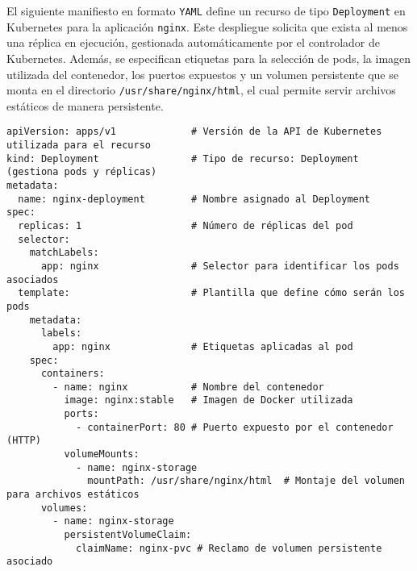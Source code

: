 El siguiente manifiesto en formato \texttt{YAML} define un recurso de tipo \texttt{Deployment} en Kubernetes para la aplicación \texttt{nginx}. Este despliegue solicita que exista al menos una réplica en ejecución, gestionada automáticamente por el controlador de Kubernetes. Además, se especifican etiquetas para la selección de pods, la imagen utilizada del contenedor, los puertos expuestos y un volumen persistente que se monta en el directorio \texttt{/usr/share/nginx/html}, el cual permite servir archivos estáticos de manera persistente.

\begin{verbatim}
apiVersion: apps/v1             # Versión de la API de Kubernetes utilizada para el recurso
kind: Deployment                # Tipo de recurso: Deployment (gestiona pods y réplicas)
metadata:
  name: nginx-deployment        # Nombre asignado al Deployment
spec:
  replicas: 1                   # Número de réplicas del pod
  selector:
    matchLabels:
      app: nginx                # Selector para identificar los pods asociados
  template:                     # Plantilla que define cómo serán los pods
    metadata:
      labels:
        app: nginx              # Etiquetas aplicadas al pod
    spec:
      containers:
        - name: nginx           # Nombre del contenedor
          image: nginx:stable   # Imagen de Docker utilizada
          ports:
            - containerPort: 80 # Puerto expuesto por el contenedor (HTTP)
          volumeMounts:
            - name: nginx-storage
              mountPath: /usr/share/nginx/html  # Montaje del volumen para archivos estáticos
      volumes:
        - name: nginx-storage
          persistentVolumeClaim:
            claimName: nginx-pvc # Reclamo de volumen persistente asociado
\end{verbatim}
